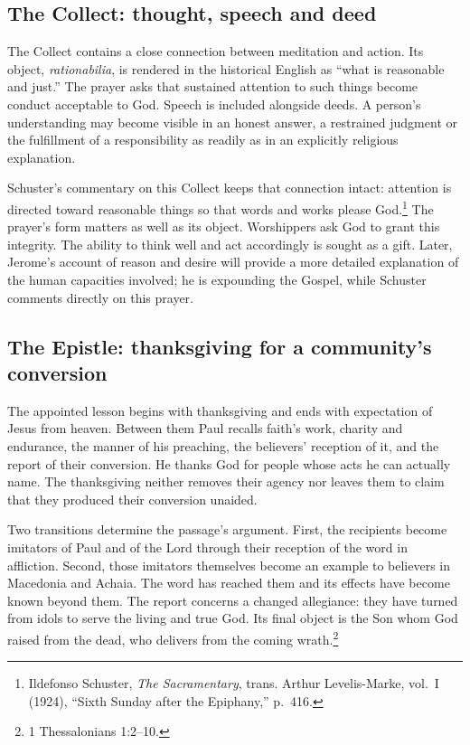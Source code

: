 \subsection{The Collect: thought, speech and deed}

The Collect contains a close connection between meditation and action. Its object, \textit{rationabilia}, is rendered in the historical English as ``what is reasonable and just.'' The prayer asks that sustained attention to such things become conduct acceptable to God. Speech is included alongside deeds. A person's understanding may become visible in an honest answer, a restrained judgment or the fulfillment of a responsibility as readily as in an explicitly religious explanation.

Schuster's commentary on this Collect keeps that connection intact: attention is directed toward reasonable things so that words and works please God.\footnote{Ildefonso Schuster, \textit{The Sacramentary}, trans. Arthur Levelis-Marke, vol.~I (1924), ``Sixth Sunday after the Epiphany,'' p.~416.} The prayer's form matters as well as its object. Worshippers ask God to grant this integrity. The ability to think well and act accordingly is sought as a gift. Later, Jerome's account of reason and desire will provide a more detailed explanation of the human capacities involved; he is expounding the Gospel, while Schuster comments directly on this prayer.

\subsection{The Epistle: thanksgiving for a community's conversion}

The appointed lesson begins with thanksgiving and ends with expectation of Jesus from heaven. Between them Paul recalls faith's work, charity and endurance, the manner of his preaching, the believers' reception of it, and the report of their conversion. He thanks God for people whose acts he can actually name. The thanksgiving neither removes their agency nor leaves them to claim that they produced their conversion unaided.

Two transitions determine the passage's argument. First, the recipients become imitators of Paul and of the Lord through their reception of the word in affliction. Second, those imitators themselves become an example to believers in Macedonia and Achaia. The word has reached them and its effects have become known beyond them. The report concerns a changed allegiance: they have turned from idols to serve the living and true God. Its final object is the Son whom God raised from the dead, who delivers from the coming wrath.\footnote{1 Thessalonians 1:2--10.}

